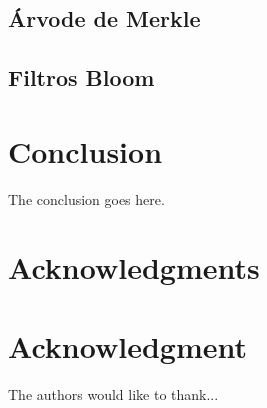 \documentclass[conference,compsoc]{IEEEtran}
\begin{document}
\subsection*{Árvode de Merkle}

\subsection*{Filtros Bloom}
 
   
\section{Conclusion}
The conclusion goes here.







\ifCLASSOPTIONcompsoc
  \section*{Acknowledgments}
\else
  \section*{Acknowledgment}
\fi


The authors would like to thank...







%
%
%







\end{document}

